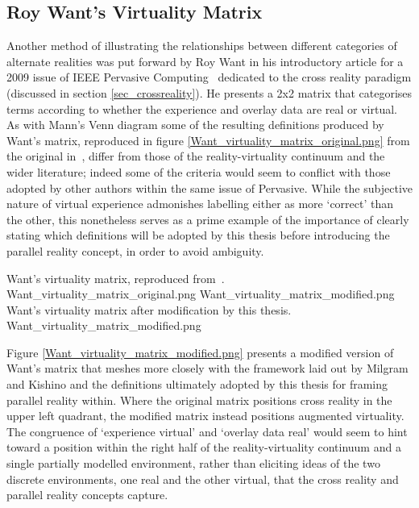 \subsection{Roy Want's Virtuality Matrix}
\label{roy-wants-virtuality-matrix}
Another method of illustrating the relationships between different categories of alternate realities was put forward by Roy Want in his introductory article for a 2009 issue of IEEE Pervasive Computing~\cite{Want2009} dedicated to the cross reality paradigm (discussed in section \ref{sec_crossreality}). He presents a 2x2 matrix that categorises terms according to whether the experience and overlay data are real or virtual. As with Mann's Venn diagram some of the resulting definitions produced by Want's matrix, reproduced in figure \ref{Want_virtuality_matrix_original.png} from the original in~\cite{Want2009}, differ from those of the reality-virtuality continuum and the wider literature; indeed some of the criteria would seem to conflict with those adopted by other authors within the same issue of Pervasive. While the subjective nature of virtual experience admonishes labelling either as more `correct' than the other, this nonetheless serves as a prime example of the importance of clearly stating which definitions will be adopted by this thesis before introducing the parallel reality concept, in order to avoid ambiguity.

 {Want's virtuality matrix, reproduced from~\cite{Want2009}.} {Want_virtuality_matrix_original.png}
       {Want_virtuality_matrix_modified.png} {Want's virtuality matrix after modification by this thesis.} {Want_virtuality_matrix_modified.png}

\pagebreak

Figure \ref{Want_virtuality_matrix_modified.png} presents a modified version of Want's matrix that meshes more closely with the framework laid out by Milgram and Kishino and the definitions ultimately adopted by this thesis for framing parallel reality within. Where the original matrix positions cross reality in the upper left quadrant, the modified matrix instead positions augmented virtuality. The congruence of `experience virtual' and `overlay data real' would seem to hint toward a position within the right half of the reality-virtuality continuum and a single partially modelled environment, rather than eliciting ideas of the two discrete environments, one real and the other virtual, that the cross reality and parallel reality concepts capture.

